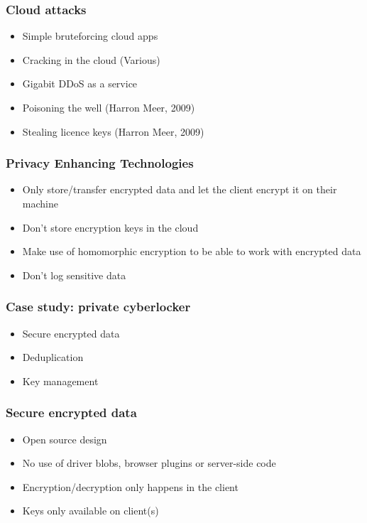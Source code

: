 \documentclass{beamer}
\begin{document}
\begin{frame}
    \frametitle{Cloud attacks}
    \begin{itemize}
      \item Simple bruteforcing cloud apps
      \item Cracking in the cloud (Various) %
      \item Gigabit DDoS as a service %
      \item Poisoning the well (Harron Meer, 2009)
      \item Stealing licence keys (Harron Meer, 2009)
    \end{itemize}
\end{frame}

\begin{frame}
    \frametitle{Privacy Enhancing Technologies}
    \begin{itemize}
      \item Only store/transfer encrypted data and let the client encrypt it on their machine
      \item Don't store encryption keys in the cloud
      \item Make use of homomorphic encryption to be able to work with encrypted data
      \item Don't log sensitive data
    \end{itemize}
\end{frame}

\begin{frame}
    \frametitle{Case study: private cyberlocker}
    \begin{itemize}
    \item Secure encrypted data
    \item Deduplication
    \item Key management
    \end{itemize}
\end{frame}

\begin{frame}
    \frametitle{Secure encrypted data}
    \begin{itemize}
    \item Open source design
    \item No use of driver blobs, browser plugins or server-side code
    \item Encryption/decryption only happens in the client
    \item Keys only available on client(s)
    \end{itemize}
\end{frame}
\end{document}
